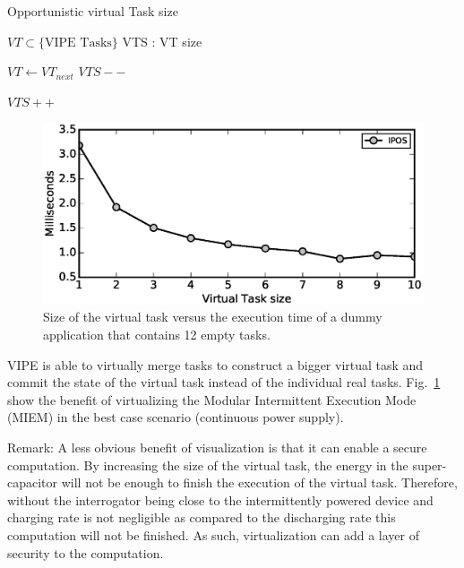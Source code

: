 \documentclass[pageno]{jpaper}
\newcommand{\sys}{VIPE\xspace}
\begin{document}
	\begin{algorithm}[t]
		\caption{Opportunistic virtual Task size}
		\label{algo:fixVirtTask}
		\scriptsize
		\begin{algorithmic}[1]
			\State $VT \subset \text{\{\sys Tasks\}} $  
			\State VTS : VT size
			\vspace{0.1cm}

				\State $VT \leftarrow VT_{next}$
				\vspace{0.1cm}
							\State $VTS--$  
						\EndIf
				\EndWhile

				\vspace{0.1cm}
					\State $VTS++$
				\EndIf
			\EndWhile
		\end{algorithmic}
	\end{algorithm}

\begin{figure}[t]
	\centering
	\includegraphics[width=0.8\columnwidth]{figures/virtualTaskSize.eps}
	\caption{Size of the virtual task versus the execution time of a dummy application that contains 12 empty tasks.}
	\label{fig:virtualTaskSize}
\end{figure}

\sys is able to virtually merge tasks to construct a bigger virtual task and commit the state of the virtual task instead of the individual real tasks. 
Fig.~\ref{fig:virtualTaskSize} show the benefit of virtualizing the Modular Intermittent Execution Mode (MIEM) in the best case scenario (continuous power supply). 

Remark: A less obvious benefit of visualization is that it can enable a secure computation. By increasing the size of the virtual task, the energy in the super-capacitor will not be enough to finish the execution of the virtual task. Therefore, without the interrogator being close to the intermittently powered device and charging rate is not negligible as compared to the discharging rate this computation will not be finished. As such, virtualization can add a layer of security to the computation.
\end{document}
